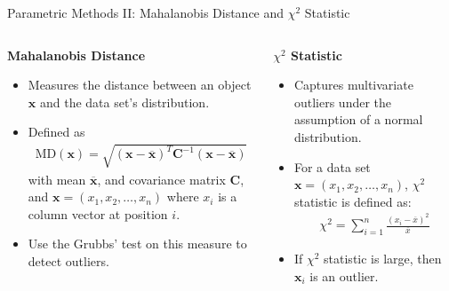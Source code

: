 \begin{frame}{Parametric Methods II: Mahalanobis Distance and $\chi^2$ Statistic}
	\vspace*{-2em}
	\begin{columns}[t]
		\begin{column}{0.5\textwidth}
			\begin{center}
				\textbf{Mahalanobis Distance}
			\end{center}
			\vspace*{-1em}
			\begin{itemize}
				\item Measures the distance between an object $\mathbf{x}$ and the data set's distribution.
				\item Defined as
				      \begin{align*}
					      \text{MD}(\mathbf{x}) = \sqrt{(\mathbf{x} - \mathbf{\overline{x}})^T \mathbf{C}^{-1} (\mathbf{x} - \mathbf{\overline{x}})}
				      \end{align*}
				      with mean $\mathbf{\overline{x}}$, and covariance matrix $\mathbf{C}$, and $\mathbf{x}=(x_1, x_2, \dots, x_n)$ where $x_i$ is a column vector at position $i$.
				\item Use the Grubbs' test on this measure to detect outliers.
			\end{itemize}
		\end{column}

		\begin{column}{0.5\textwidth}
			\begin{center}
				\textbf{$\chi^2$ Statistic}
			\end{center}
			\vspace*{-1em}
			\begin{itemize}
				\item Captures multivariate outliers under the assumption of a normal distribution.
				\item For a data set $\mathbf{x}=(x_1, x_2, \dots, x_n)$, $\chi^2$ statistic is defined as:
				      \begin{align*}
					      \chi^2 = \sum_{i=1}^n \frac{(x_i - \overline{x})^2}{\overline{x}}
				      \end{align*}
				\item If $\chi^2$ statistic is large, then $\mathbf{x}_i$ is an outlier.
			\end{itemize}
		\end{column}
	\end{columns}
\end{frame}

